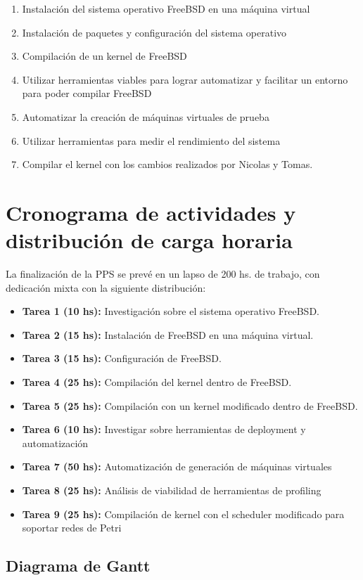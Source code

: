 \documentclass[a4paper, 11pt]{article}
\begin{document}
\begin{enumerate}
	\item Instalación del sistema operativo FreeBSD en una máquina virtual
	\item Instalación de paquetes y configuración del sistema operativo
	\item Compilación de un kernel de FreeBSD
	\item Utilizar herramientas viables para lograr automatizar y facilitar un entorno para poder compilar FreeBSD
	\item Automatizar la creación de máquinas virtuales de prueba
	\item Utilizar herramientas para medir el rendimiento del sistema
	\item Compilar el kernel con los cambios realizados por Nicolas y Tomas.
\end{enumerate}
\newpage
\section*{Cronograma de actividades y distribución de carga horaria}
	
	La finalización de la PPS se prevé en un lapso de 200 hs. de trabajo, con dedicación mixta con la siguiente distribución:
	
	\begin{itemize}
		\item \textbf{Tarea 1 (10 hs):} Investigación sobre el sistema operativo FreeBSD.
		\item \textbf{Tarea 2 (15 hs):} Instalación de FreeBSD en una máquina virtual.
		\item \textbf{Tarea 3 (15 hs):} Configuración de FreeBSD.
		\item \textbf{Tarea 4 (25 hs):} Compilación del kernel dentro de FreeBSD.
		\item \textbf{Tarea 5 (25 hs):} Compilación con un kernel modificado dentro de FreeBSD.
		\item \textbf{Tarea 6 (10 hs):} Investigar sobre herramientas de deployment y automatización
		\item \textbf{Tarea 7 (50 hs):} Automatización de generación de máquinas virtuales
		\item \textbf{Tarea 8 (25 hs):} Análisis de viabilidad de herramientas de profiling 
		\item \textbf{Tarea 9 (25 hs):} Compilación de kernel con el scheduler modificado para soportar redes de Petri
	\end{itemize}

\subsection*{Diagrama de Gantt}
	\vspace{1cm}
	\scalebox{.53}{}
\end{document}
